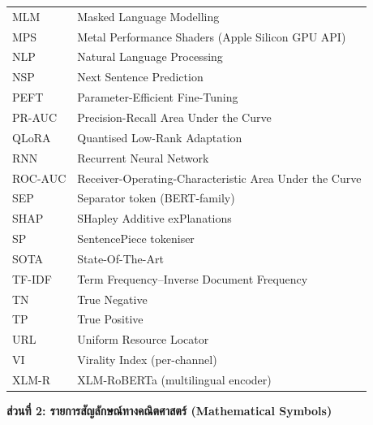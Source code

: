 \begin{longtable}{p{3cm}p{10.5cm}}
MLM     & Masked Language Modelling \\
MPS     & Metal Performance Shaders (Apple Silicon GPU API) \\
NLP     & Natural Language Processing \\
NSP     & Next Sentence Prediction \\
PEFT    & Parameter-Efficient Fine-Tuning \\
PR-AUC  & Precision-Recall Area Under the Curve \\
QLoRA   & Quantised Low-Rank Adaptation \\
RNN     & Recurrent Neural Network \\
ROC-AUC & Receiver-Operating-Characteristic Area Under the Curve \\
SEP     & Separator token (BERT-family) \\
SHAP    & SHapley Additive exPlanations \\
SP      & SentencePiece tokeniser \\
SOTA    & State-Of-The-Art \\
TF-IDF  & Term Frequency--Inverse Document Frequency \\
TN      & True Negative \\
TP      & True Positive \\
URL     & Uniform Resource Locator \\
VI      & Virality Index (per-channel) \\
XLM-R   & XLM-RoBERTa (multilingual encoder) \\
\bottomrule
\end{longtable}

\vspace{0.6cm}
\noindent\textbf{ส่วนที่ 2: รายการสัญลักษณ์ทางคณิตศาสตร์ (Mathematical Symbols)}

